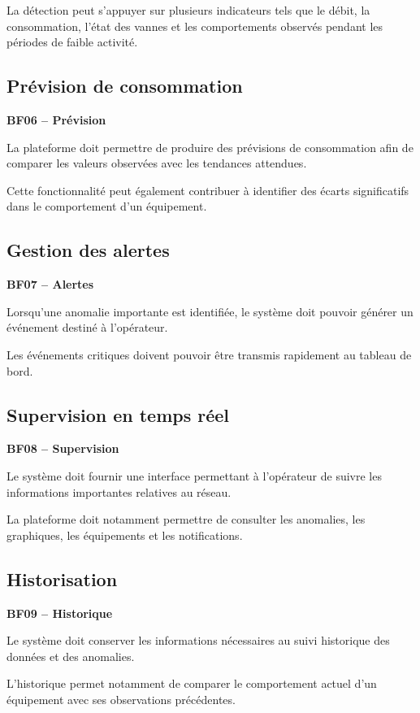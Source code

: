 La détection peut s'appuyer sur plusieurs indicateurs tels que le débit,
la consommation, l'état des vannes et les comportements observés pendant
les périodes de faible activité.

\subsection{Prévision de consommation}

\textbf{BF06 -- Prévision}

La plateforme doit permettre de produire des prévisions de consommation
afin de comparer les valeurs observées avec les tendances attendues.

Cette fonctionnalité peut également contribuer à identifier des écarts
significatifs dans le comportement d'un équipement.

\subsection{Gestion des alertes}

\textbf{BF07 -- Alertes}

Lorsqu'une anomalie importante est identifiée, le système doit pouvoir
générer un événement destiné à l'opérateur.

Les événements critiques doivent pouvoir être transmis rapidement au
tableau de bord.

\subsection{Supervision en temps réel}

\textbf{BF08 -- Supervision}

Le système doit fournir une interface permettant à l'opérateur de suivre
les informations importantes relatives au réseau.

La plateforme doit notamment permettre de consulter les anomalies, les
graphiques, les équipements et les notifications.

\subsection{Historisation}

\textbf{BF09 -- Historique}

Le système doit conserver les informations nécessaires au suivi historique
des données et des anomalies.

L'historique permet notamment de comparer le comportement actuel d'un
équipement avec ses observations précédentes.

